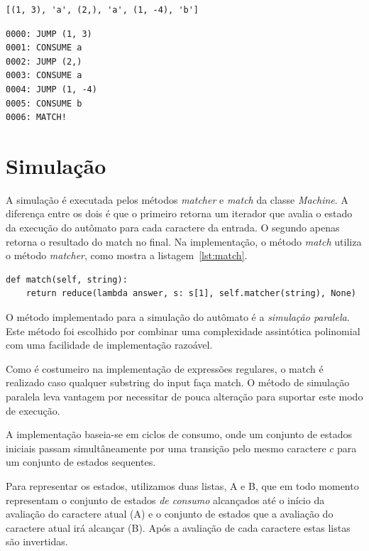 \documentclass[a4paper,12pt,oneside,onecolumn]{uerj}
\begin{document}
{
  \lstset{%
    basicstyle=\ttfamily\normalsize,
  }
\begin{lstlisting}[caption={Representação do autômato como array},label=lst:automaton_array]
	[(1, 3), 'a', (2,), 'a', (1, -4), 'b']
\end{lstlisting}
}

{
  \lstset{%
    basicstyle=\ttfamily\normalsize,
  }
\begin{lstlisting}[caption={Representação do autômato como instruções},label=lst:automaton_instr]
0000: JUMP (1, 3)
0001: CONSUME a
0002: JUMP (2,)
0003: CONSUME a
0004: JUMP (1, -4)
0005: CONSUME b
0006: MATCH!
\end{lstlisting}
}


\section{Simulação}

A simulação é executada pelos métodos \emph{matcher} e \emph{match} da classe \emph{Machine}. A diferença entre os dois é que o primeiro retorna um iterador que avalia o estado da execução do autômato para cada caractere da entrada. O segundo apenas retorna o resultado do match no final. Na implementação, o método \emph{match} utiliza o método \emph{matcher}, como mostra a listagem~\ref{lst:match}.

\vspace{0.5cm}
\begin{lstlisting}[caption={Implementação do método \emph{match}},label=lst:match]
def match(self, string):
    return reduce(lambda answer, s: s[1], self.matcher(string), None)
\end{lstlisting}

O método implementado para a simulação do autômato é a \emph{simulação paralela}. Este método foi escolhido por combinar uma complexidade assintótica polinomial com uma facilidade de implementação razoável.

Como é costumeiro na implementação de expressões regulares, o match é realizado caso qualquer substring do input faça match. O método de simulação paralela leva vantagem por necessitar de pouca alteração para suportar este modo de execução.

A implementação baseia-se em ciclos de consumo, onde um conjunto de estados iniciais passam simultâneamente por uma transição pelo mesmo caractere $c$ para um conjunto de estados sequentes.

Para representar os estados, utilizamos duas listas, A e B, que em todo momento representam o conjunto de estados \emph{de consumo} alcançados até o início da avaliação do caractere atual (A) e o conjunto de estados que a avaliação do caractere atual irá alcançar (B). Após a avaliação de cada caractere estas listas são invertidas. 
\end{document}
